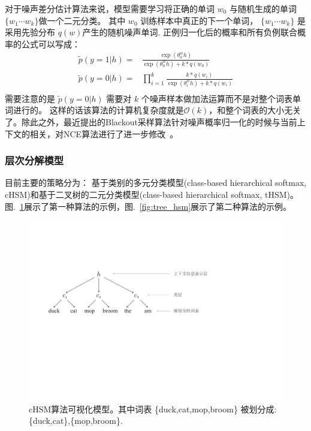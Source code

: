 \documentclass[master,openright,twoside,color]{buaathesis}
\begin{document}
对于噪声差分估计算法来说，模型需要学习将正确的单词 $w_0$ 与随机生成的单词 $\{w_1\cdots w_k\}$做一个二元分类。 其中 $w_0$ 训练样本中真正的下一个单词， $\{w_1\cdots w_k\}$ 是采用先验分布  $q(w)$产生的随机噪声单词. 正例归一化后的概率和所有负例联合概率的公式可以写成：
\begin{equation}\label{equ:nce}
\begin{split}
  \tilde{p}(y=1|h)=&\frac{\exp( \theta^w_0 h)}{ \exp( \theta^w_0 h)+k *q(w_0)}\\
  \tilde{p}(y=0|h)=&\prod_{i=1}^{k}\frac{k *q(w_i)}{\exp( \theta^w_i h)+k *q(w_i)}\\
\end{split}
\end{equation}
需要注意的是 $\tilde{p}(y=0|h)$ 需要对 $k$ 个噪声样本做加法运算而不是对整个词表单词进行的。 这样的话该算法的计算机复杂度就是$\mathcal{O}(k)$，和整个词表的大小无关了。除此之外，最近提出的Blackout采样算法针对噪声概率归一化的时候与当前上下文的相关，对NCE算法进行了进一步修改~\cite{DBLP:journals/iclr/JiVSAD15}。

\subsubsection{层次分解模型}
目前主要的策略分为： 基于类别的多元分类模型(class-based hierarchical softmax, cHSM)和基于二叉树的二元分类模型(class-based hierarchical softmax, tHSM)。图.~\ref{fig:case_hsm}展示了第一种算法的示例，图.~\ref{fig:tree_hsm}展示了第二种算法的示例。
\begin{figure}
  \centering
\includegraphics[width=0.65\linewidth]{./figures/case_chsm.pdf}
\caption{cHSM算法可视化模型。其中词表 \{duck,cat,mop,broom\} 被划分成:\{duck,cat\},\{mop,broom\}.}\label{fig:case_hsm}
\end{figure}
\end{document}
